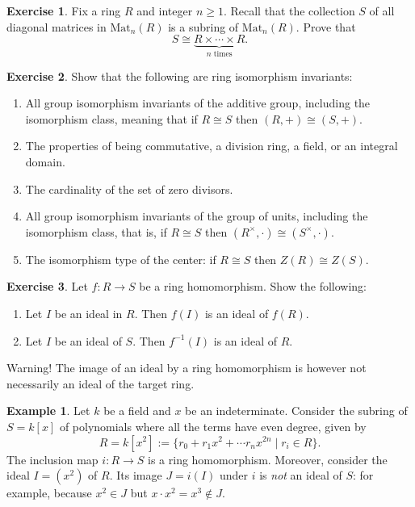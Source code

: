 \documentclass[12pt]{report}
\numberwithin{equation}{section}
\numberwithin{theorem}{chapter}
\theoremstyle{definition}
\newtheorem{example}[theorem]{Example}
\newtheorem{exercise}{Exercise}
\newtheorem*{basic properties}{Basic Properties}
\newtheorem*{Important Remark}{Important Remark}
\begin{document}
\begin{exercise} 
Fix a ring $R$ and integer $n \geqslant 1$. Recall that the collection $S$ of all diagonal matrices in $\mathrm{Mat}_{n}(R)$ is a subring of $\mathrm{Mat}_{n}(R)$. Prove that 
$$S \cong \underset{n \text{ times}}{\underbrace{R \times \cdots \times R}}.$$
\end{exercise}



\begin{exercise}
Show that the following are ring isomorphism invariants:
\begin{enumerate}[itemsep=0.1em]
\item All group isomorphism invariants of the additive group,  including the isomorphism class, meaning that if $R\cong S$ then $(R,+)\cong(S,+)$.
\item The properties of being commutative, a division ring, a field, or an integral domain.
\item The cardinality of the set of zero divisors. 
\item All group isomorphism invariants of the group of units, including the isomorphism class, that is, if $R\cong S$ then $(R^\times,\cdot)\cong(S^\times,\cdot)$.
\item The isomorphism type of the center: if $R\cong S$ then $Z(R)\cong Z(S)$.
\end{enumerate}
\end{exercise}


\begin{exercise}
	Let $f\!: R \to S$ be a ring homomorphism. Show the following:
	
	\begin{enumerate}[itemsep=-0.1em]
		\item Let $I$ be an ideal in $R$. Then $f(I)$ is an ideal of $f(R)$. 
		\item Let $I$ be an ideal of $S$. Then $f^{-1}(I)$ is an ideal of $R$.
	\end{enumerate}
\end{exercise}


Warning! The image of an ideal by a ring homomorphism is however not necessarily an ideal of the target ring.

\begin{example}
	Let $k$ be a field and $x$ be an indeterminate. Consider the subring of $S = k[x]$ of polynomials where all the terms have even degree, given by
	$$R = k[x^2] := \{ r_0 + r_1 x^2 + \cdots r_n x^{2n} \mid r_i \in R \}.$$
	The inclusion map $i\!: R \to S$ is a ring homomorphism. Moreover, consider the ideal $I = (x^2)$ of $R$. Its image $J = i(I)$ under $i$ is \emph{not} an ideal of $S$: for example, because $x^2 \in J$ but $x \cdot x^2 = x^3 \notin J$.
\end{example}
\end{document}
